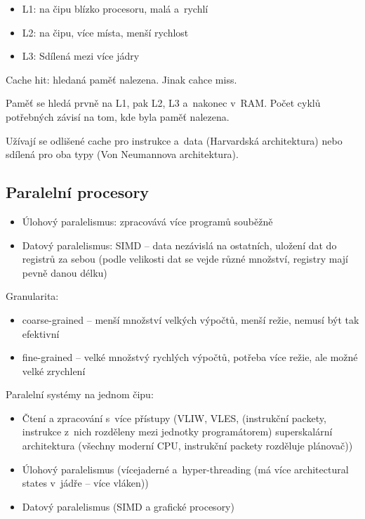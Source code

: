 \begin{itemize}
    \item L1: na čipu blízko procesoru, malá a~rychlí
    \item L2: na čipu, více místa, menší rychlost
    \item L3: Sdílená mezi více jádry
\end{itemize}

Cache hit: hledaná paměť nalezena. Jinak cahce miss.

Paměť se hledá prvně na L1, pak L2, L3 a~nakonec v~RAM. Počet cyklů potřebných závisí na tom, kde byla paměť nalezena.

Užívají se odlišené cache pro instrukce a~data (Harvardská architektura) nebo sdílená pro oba  typy (Von Neumannova architektura).

\subsection{Paralelní procesory}
\begin{itemize}
    \item Úlohový paralelismus: zpracovává více programů souběžně
    \item Datový paralelismus: SIMD -- data nezávislá na ostatních, uložení dat do registrů za sebou (podle velikosti dat se vejde různé množství, registry mají pevně danou délku)
\end{itemize}

Granularita:
\begin{itemize}
    \item coarse-grained -- menší množství velkých výpočtů, menší režie, nemusí být tak efektivní
    \item fine-grained -- velké množstvý rychlých výpočtů, potřeba více režie, ale možné velké zrychlení
\end{itemize}

Paralelní systémy na jednom čipu:
\begin{itemize}
    \item Čtení a zpracování s~více přístupy (VLIW, VLES, (instrukční packety, instrukce z~nich rozděleny mezi jednotky programátorem) superskalární architektura (všechny moderní CPU, instrukční packety rozděluje plánovač))
    \item Úlohový paralelismus (vícejaderné a~hyper-threading (má více architectural states v~jádře -- více vláken))
    \item Datový paralelismus (SIMD a grafické procesory)
\end{itemize}


